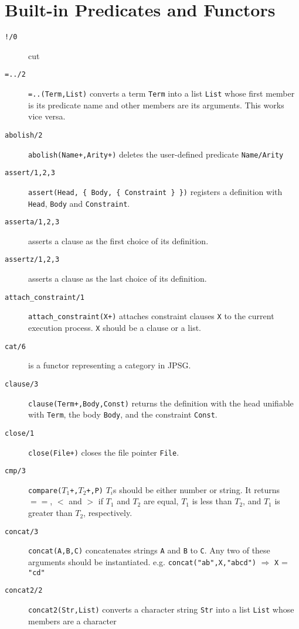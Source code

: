 \section{Built-in Predicates and Functors}
\begin{description}
 \item[{\tt !/0}] cut
 \item[{\tt =../2}] 
	 {\tt =..(Term,List)} converts a term {\tt Term} into
         a list {\tt List} whose first member is its predicate name
         and other members are its arguments. This works vice versa.
 \item[{\tt abolish/2}] {\tt abolish(Name+,Arity+)}
	 deletes the user-defined predicate {\tt Name/Arity}
 \item[{\tt assert/1,2,3}]
	{\tt assert(Head, \{ Body, \{ Constraint \} \})} registers a definition
	with {\tt Head}, {\tt Body} and {\tt Constraint}.
 \item[{\tt asserta/1,2,3}]
         asserts a clause as the first choice of its definition.
 \item[{\tt assertz/1,2,3}]
         asserts a clause as the last choice of its definition.
 \item[{\tt attach\_constraint/1}]
        {\tt attach\_constraint(X+)} attaches constraint clauses {\tt X}
         to the current execution process. {\tt X} should be a clause or
        a list.
 \item[{\tt cat/6}] is a functor representing a category in JPSG.
 \item[{\tt clause/3}]
         {\tt clause(Term+,Body,Const)} returns the definition with the
	head unifiable with {\tt Term}, the body {\tt Body}, and the constraint
	{\tt Const}.
 \item[{\tt close/1}] {\tt close(File+)} closes the file pointer {\tt File}.
 \item[{\tt cmp/3}]
         {\tt compare($T_{1}$+,$T_{2}$+,P)} {\tt $T_{i}$}s should be either
	number or string. It returns $==$, $<$ and $>$ if {\tt $T_{1}$}
	and {\tt $T_{2}$} are equal, {\tt $T_{1}$} is less than {\tt $T_{2}$},
	and {\tt $T_{1}$} is greater than {\tt $T_{2}$}, respectively.
 \item[{\tt concat/3}] {\tt concat(A,B,C)}
	concatenates strings {\tt A} and {\tt B} to {\tt C}. Any two of these arguments should be instantiated.
	e.g. {\tt concat("ab",X,"abcd")} $\Rightarrow$ {\tt X} = {\tt "cd"}
 \item[{\tt concat2/2}] {\tt concat2(Str,List)} converts a character string 
	{\tt Str} into a list {\tt List} whose members are a character

\end{description}
